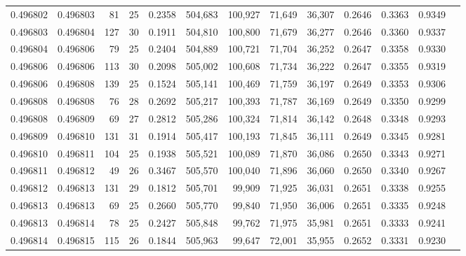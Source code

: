 \begin{tabular}{rrrrrrrrrrrrr}
0.496802 & 0.496803 &  81 &  25 &                                     0.2358 & 504,683 & 100,927 &  71,649 &  36,307 & 0.2646 & 0.3363 & 0.9349 \\
0.496803 & 0.496804 & 127 &  30 &                                     0.1911 & 504,810 & 100,800 &  71,679 &  36,277 & 0.2646 & 0.3360 & 0.9337 \\
0.496804 & 0.496806 &  79 &  25 &                                     0.2404 & 504,889 & 100,721 &  71,704 &  36,252 & 0.2647 & 0.3358 & 0.9330 \\
0.496806 & 0.496806 & 113 &  30 &                                     0.2098 & 505,002 & 100,608 &  71,734 &  36,222 & 0.2647 & 0.3355 & 0.9319 \\
0.496806 & 0.496808 & 139 &  25 &                                     0.1524 & 505,141 & 100,469 &  71,759 &  36,197 & 0.2649 & 0.3353 & 0.9306 \\
0.496808 & 0.496808 &  76 &  28 &                                     0.2692 & 505,217 & 100,393 &  71,787 &  36,169 & 0.2649 & 0.3350 & 0.9299 \\
0.496808 & 0.496809 &  69 &  27 &                                     0.2812 & 505,286 & 100,324 &  71,814 &  36,142 & 0.2648 & 0.3348 & 0.9293 \\
0.496809 & 0.496810 & 131 &  31 &                                     0.1914 & 505,417 & 100,193 &  71,845 &  36,111 & 0.2649 & 0.3345 & 0.9281 \\
0.496810 & 0.496811 & 104 &  25 &                                     0.1938 & 505,521 & 100,089 &  71,870 &  36,086 & 0.2650 & 0.3343 & 0.9271 \\
0.496811 & 0.496812 &  49 &  26 &                                     0.3467 & 505,570 & 100,040 &  71,896 &  36,060 & 0.2650 & 0.3340 & 0.9267 \\
0.496812 & 0.496813 & 131 &  29 &                                     0.1812 & 505,701 &  99,909 &  71,925 &  36,031 & 0.2651 & 0.3338 & 0.9255 \\
0.496813 & 0.496813 &  69 &  25 &                                     0.2660 & 505,770 &  99,840 &  71,950 &  36,006 & 0.2651 & 0.3335 & 0.9248 \\
0.496813 & 0.496814 &  78 &  25 &                                     0.2427 & 505,848 &  99,762 &  71,975 &  35,981 & 0.2651 & 0.3333 & 0.9241 \\
0.496814 & 0.496815 & 115 &  26 &                                     0.1844 & 505,963 &  99,647 &  72,001 &  35,955 & 0.2652 & 0.3331 & 0.9230 \\

\end{tabular}
